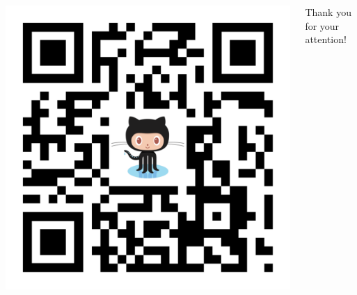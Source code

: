 \documentclass[aspectratio=169]{beamer}
\begin{document}
\begin{frame}

\begin{columns}
    \begin{column}{0.25\textwidth}
	\begin{center}	
	\bigskip
	\includegraphics[scale=0.07]{assets/qrcode-github.pdf}
	\end{center}
    \end{column}

   \begin{column}{0.48\textwidth}
\begin{center}	
        \large{Thank you for your attention!}
\end{center}
    \end{column}


\end{columns}
\end{frame}
\end{document}
